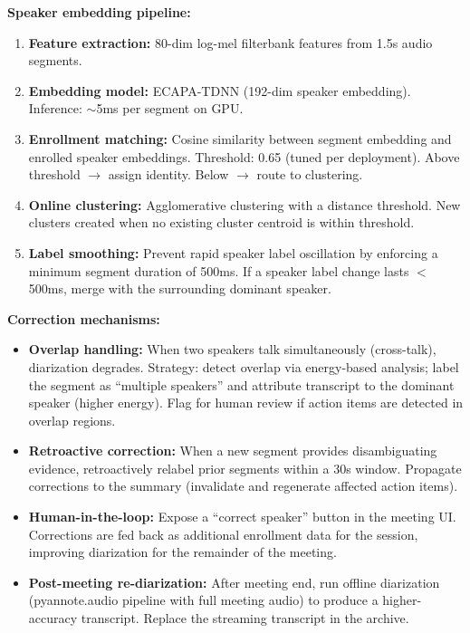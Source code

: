 \textbf{Speaker embedding pipeline:}

\begin{enumerate}
  \item \textbf{Feature extraction:} 80-dim log-mel filterbank features from 1.5s audio segments.
  \item \textbf{Embedding model:} ECAPA-TDNN (192-dim speaker embedding). Inference: $\sim$5ms per segment on GPU.
  \item \textbf{Enrollment matching:} Cosine similarity between segment embedding and enrolled speaker embeddings. Threshold: 0.65 (tuned per deployment). Above threshold $\rightarrow$ assign identity. Below $\rightarrow$ route to clustering.
  \item \textbf{Online clustering:} Agglomerative clustering with a distance threshold. New clusters created when no existing cluster centroid is within threshold.
  \item \textbf{Label smoothing:} Prevent rapid speaker label oscillation by enforcing a minimum segment duration of 500ms. If a speaker label change lasts $<$ 500ms, merge with the surrounding dominant speaker.
\end{enumerate}

\textbf{Correction mechanisms:}

\begin{itemize}
  \item \textbf{Overlap handling:} When two speakers talk simultaneously (cross-talk), diarization degrades. Strategy: detect overlap via energy-based analysis; label the segment as ``multiple speakers'' and attribute transcript to the dominant speaker (higher energy). Flag for human review if action items are detected in overlap regions.
  \item \textbf{Retroactive correction:} When a new segment provides disambiguating evidence, retroactively relabel prior segments within a 30s window. Propagate corrections to the summary (invalidate and regenerate affected action items).
  \item \textbf{Human-in-the-loop:} Expose a ``correct speaker'' button in the meeting UI. Corrections are fed back as additional enrollment data for the session, improving diarization for the remainder of the meeting.
  \item \textbf{Post-meeting re-diarization:} After meeting end, run offline diarization (pyannote.audio pipeline with full meeting audio) to produce a higher-accuracy transcript. Replace the streaming transcript in the archive.
\end{itemize}


